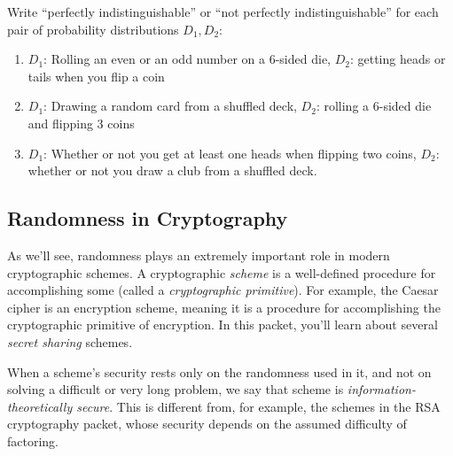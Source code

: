 
\begin{exercise}
    Write ``perfectly indistinguishable'' or ``not perfectly indistinguishable''
    for each pair of probability distributions $D_1, D_2$:
    \renewcommand{\labelenumi}{(\alph{enumi})} 
    \begin{enumerate}
        \item $D_1$: Rolling an even or an odd number on a 6-sided die, 
        $D_2$: getting heads or tails when you flip a coin
        \item $D_1$: Drawing a random card from a shuffled deck, 
        $D_2$: rolling a 6-sided die and flipping 3 coins
        \item $D_1$: Whether or not you get at least one heads when flipping
        two coins, $D_2$: whether or not you draw a club from a shuffled 
        deck.
    \end{enumerate}
\end{exercise}

\subsection{Randomness in Cryptography}

As we'll see, randomness plays an extremely important role in modern cryptographic
schemes. A cryptographic \emph{scheme} is a well-defined procedure for accomplishing 
some  (called a \emph{cryptographic primitive}). For example, the Caesar 
cipher is an encryption scheme\footnotemark, meaning it is a procedure for accomplishing
the cryptographic primitive of encryption. 
In this packet, you'll learn about several \emph{secret sharing} schemes.

When a scheme's security rests only on the randomness used in it, and not on 
solving a difficult or very long problem, we say that scheme is
\emph{information-theoretically secure}. This is different from, for example,
the schemes in the RSA cryptography packet, whose security depends on 
the assumed difficulty of factoring\footnotemark.

